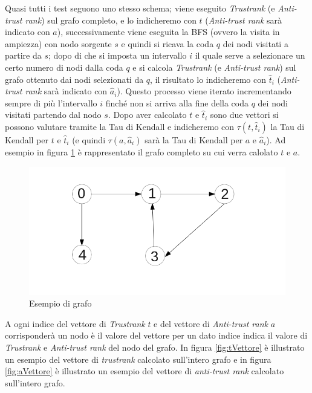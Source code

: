Quasi tutti i test seguono uno stesso schema; viene eseguito \textit{Trustrank} (e \textit{Anti-trust rank}) sul grafo completo, e lo indicheremo con \(t\) (\textit{Anti-trust rank} sarà indicato con \(a\)), successivamente viene eseguita la BFS (ovvero la visita in ampiezza) con nodo sorgente \(s\) e quindi si ricava la coda \(q\) dei nodi visitati a partire da \(s\); dopo di che si imposta un intervallo \(i\) il quale serve a selezionare un certo numero di nodi dalla coda \(q\) e si calcola \textit{Trustrank} (e \textit{Anti-trust rank}) sul grafo ottenuto dai  nodi selezionati da \(q\), il risultato lo indicheremo con \(\hat{t}_i\) (\textit{Anti-trust rank} sarà indicato con \(\hat{a}_i\)). Questo processo viene iterato incrementando sempre di più l'intervallo \(i\) finché non si arriva alla fine della coda \(q\) dei nodi visitati partendo dal nodo \(s\). Dopo aver calcolato \(t\) e \(\hat{t}_i\) sono due vettori si possono valutare tramite la Tau di Kendall e indicheremo con \(\tau(t,\hat{t}_i)\) la Tau 
di Kendall per \(t\) e \(\hat{t}_i\)  (e quindi \(\tau(a,\hat{a}_i)\) sarà la Tau di Kendall per \(a\) e \(\hat{a}_i\)). Ad esempio in figura \ref{fig:grafoComp} è rappresentato il 
grafo completo su cui verra calolato \(t\) e \(a\).
 \begin{figure}
\centering
 \includegraphics{immagini/test/grafoComp}
 \caption{Esempio di grafo}
 \label{fig:grafoComp}
\end{figure}
A ogni indice del  vettore di \textit{Trustrank} \(t\) e del vettore di \textit{Anti-trust rank} \(a\) corrisponderà un nodo è il valore del vettore per un dato indice indica il valore di \textit{Trustrank} e \textit{Anti-trust rank} del nodo del grafo. In figura \ref{fig:tVettore} è illustrato un esempio del vettore di \textit{trustrank} calcolato sull'intero grafo e in figura \ref{fig:aVettore} è illustrato un esempio del vettore di \textit{anti-trust rank} calcolato sull'intero grafo. 
